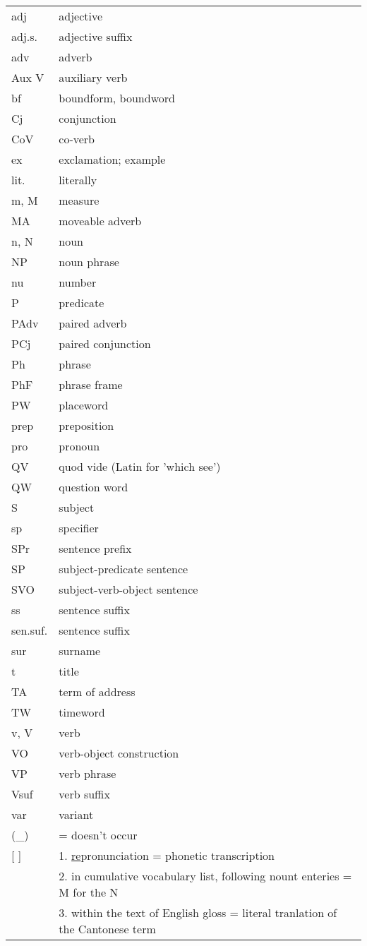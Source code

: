 \begin{tabularx}{\linewidth}{l l}
    adj & adjective \\
    adj.s. & adjective suffix \\
    adv & adverb \\
    Aux V & auxiliary verb \\
    bf & boundform, boundword \\
    Cj & conjunction \\
    CoV & co-verb \\
    ex & exclamation; example \\
    lit. & literally \\
    m, M & measure \\
    MA & moveable adverb \\
    n, N & noun \\
    NP & noun phrase \\
    nu & number \\
    P & predicate \\
    PAdv & paired adverb \\
    PCj & paired conjunction \\
    Ph & phrase \\
    PhF & phrase frame \\
    PW & placeword \\
    prep & preposition \\
    pro & pronoun \\
    QV & quod vide (Latin for 'which see') \\
    QW & question word \\
    S & subject \\
    sp & specifier \\
    SPr & sentence prefix \\
    SP & subject-predicate sentence \\
    SVO & subject-verb-object sentence \\
    ss & sentence suffix \\
    sen.suf. & sentence suffix \\
    sur & surname \\
    t & title \\
    TA & term of address \\
    TW & timeword \\
    v, V & verb \\
    VO & verb-object construction \\
    VP & verb phrase \\
    Vsuf & verb suffix \\
    var & variant \\
    (\_) & = doesn't occur \\
    {[ ]} & 1. \underline{re}pronunciation = phonetic transcription \\
     & 2. in cumulative vocabulary list, following nount enteries = M for the N \\
     & 3. within the text of English gloss = literal tranlation of the Cantonese term \\
\end{tabularx}
